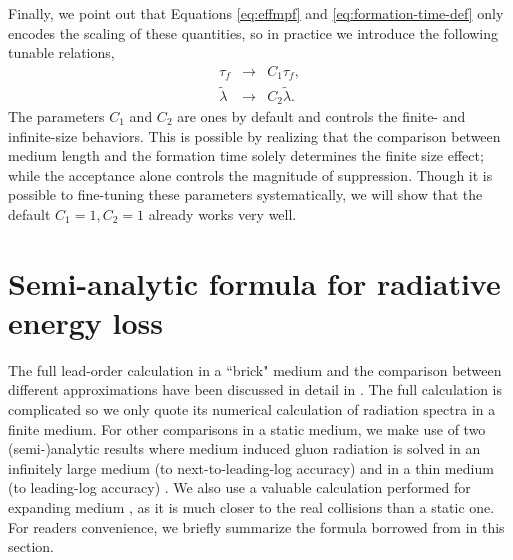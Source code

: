 \documentclass[aps, prc, reprint, amsmath, groupedaddress, nofootinbib]{revtex4-1}
\begin{document}
{Finally, we point out that Equations \ref{eq:effmpf} and \ref{eq:formation-time-def} only encodes the scaling of these quantities, so in practice we introduce the following tunable relations,
\begin{eqnarray}\label{eq:tune}
\nonumber
\tau_f & \rightarrow & C_1 \tau_f, \\
\tilde{\lambda} & \rightarrow & C_2 \tilde{\lambda}.
\end{eqnarray}
The parameters $C_1$ and $C_2$ are ones by default and controls the finite- and infinite-size behaviors. 
This is possible by realizing that the comparison between medium length and the formation time solely determines the finite size effect; while the acceptance alone controls the magnitude of suppression.
Though it is possible to fine-tuning these parameters systematically, we will show that the default $C_1 = 1, C_2 = 1$ already works very well.



\section{Semi-analytic formula for radiative energy loss}\label{section:Theo}
The full lead-order calculation in a ``brick" medium and the comparison between different approximations have been discussed in detail in \cite{CaronHuot:2008uh}.
The full calculation is complicated so we only quote its numerical calculation of radiation spectra in a finite medium.
For other comparisons in a static medium, we make use of two (semi-)analytic results where medium induced gluon radiation is solved in an infinitely large medium (to next-to-leading-log accuracy) \cite{Arnold:2008zu} and in a thin medium (to leading-log accuracy) \cite{Arnold:2009mr}.
We also use a valuable calculation performed for expanding medium \cite{Baier:1998yf}, as it is much closer to the real collisions than a static one.
For readers convenience, we briefly summarize the formula borrowed from \cite{Arnold:2008zu,Arnold:2009mr,Baier:1998yf} in this section.

}
\end{document}
